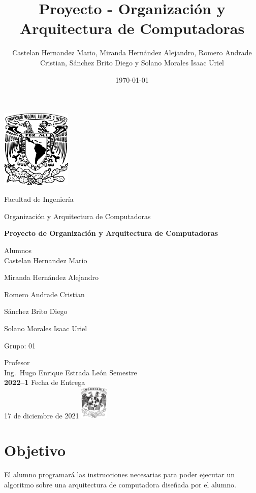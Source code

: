 \documentclass{IEEEtran}
\author{Castelan Hernandez Mario, Miranda Hernández Alejandro, Romero Andrade Cristian, Sánchez Brito Diego y Solano Morales Isaac Uriel}
\date{\today}
\title{Proyecto - Organización y Arquitectura de Computadoras}
\begin{document}
\begin{titlepage}
\centering
\includegraphics[width=0.25\textwidth]{./img_common/unam_logo}\vspace{0.5cm}\\
{\scshape{\Huge Facultad de Ingeniería\par{}}}\vspace{0.25cm}
{\scshape{\Large Organización y Arquitectura de Computadoras\par{}}}\vfill{}
{\huge \textbf{Proyecto de Organización y Arquitectura de Computadoras}}\vfill{}
{\Large Alumnos\\
Castelan Hernandez Mario

Miranda Hernández Alejandro

Romero Andrade Cristian

Sánchez Brito Diego

Solano Morales Isaac Uriel

}\vfill{}
{\large Grupo: 01\par{}}\vfill{}
{\large Profesor\\Ing.~Hugo Enrique Estrada León}\vfill{}
\vfil{}
{\large Semestre\\\textbf{2022--1}}
\vfill{}
{\large Fecha de Entrega\\17 de diciembre de 2021}
\vfill{}
\includegraphics[width=0.1\textwidth]{./img_common/inge_logo}
\end{titlepage}

\maketitle
\tableofcontents

\section{Objetivo}
\label{sec:orgcf1df0f}
El alumno programará las instrucciones necesarias para poder ejecutar un algoritmo sobre una arquitectura de computadora  diseñada por el alumno.
\end{document}
